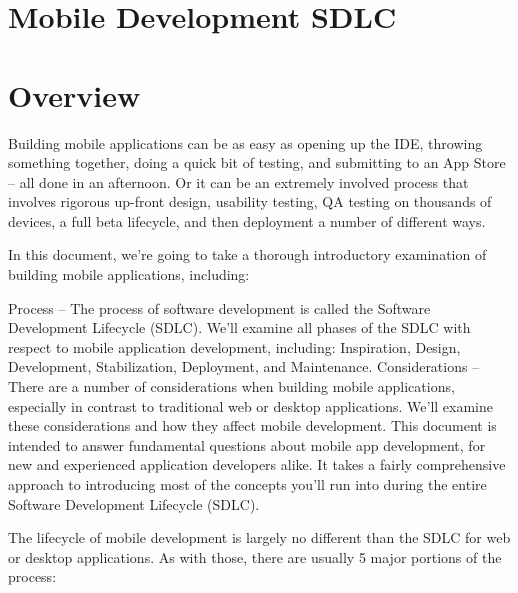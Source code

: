\section{Mobile Development SDLC}

\section{Overview}


Building mobile applications can be as easy as opening up the IDE, throwing something together, doing a quick bit of testing, and submitting to an App Store – all done in an afternoon. Or it can be an extremely involved process that involves rigorous up-front design, usability testing, QA testing on thousands of devices, a full beta lifecycle, and then deployment a number of different ways.

In this document, we’re going to take a thorough introductory examination of building mobile applications, including:

Process – The process of software development is called the Software Development Lifecycle (SDLC). We’ll examine all phases of the SDLC with respect to mobile application development, including: Inspiration, Design, Development, Stabilization, Deployment, and Maintenance.
Considerations – There are a number of considerations when building mobile applications, especially in contrast to traditional web or desktop applications. We’ll examine these considerations and how they affect mobile development.
This document is intended to answer fundamental questions about mobile app development, for new and experienced application developers alike. It takes a fairly comprehensive approach to introducing most of the concepts you’ll run into during the entire Software Development Lifecycle (SDLC).


The lifecycle of mobile development is largely no different than the SDLC for web or desktop applications. As with those, there are usually 5 major portions of the process:

